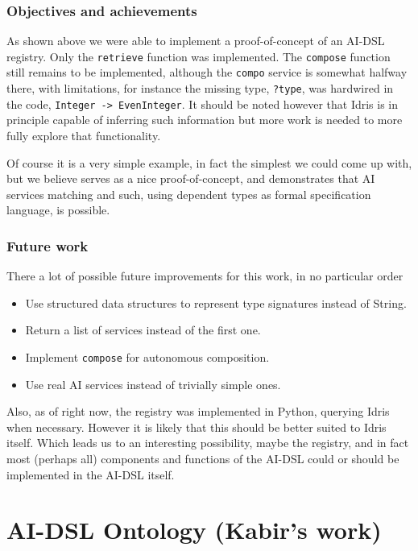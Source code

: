 \documentclass[]{report}
\begin{document}
\subsection{Objectives and achievements}

As shown above we were able to implement a proof-of-concept of an
AI-DSL registry.  Only the \texttt{retrieve} function was implemented.
The \texttt{compose} function still remains to be implemented,
although the \texttt{compo} service is somewhat halfway there, with
limitations, for instance the missing type, \texttt{?type}, was
hardwired in the code, \texttt{Integer -> EvenInteger}.  It should be
noted however that Idris is in principle capable of inferring such
information but more work is needed to more fully explore that
functionality.

Of course it is a very simple example, in fact the simplest we could
come up with, but we believe serves as a nice proof-of-concept, and
demonstrates that AI services matching and such, using dependent types
as formal specification language, is possible.

\subsection{Future work}

There a lot of possible future improvements for this work, in no
particular order
\begin{itemize}
\item Use structured data structures to represent type signatures
  instead of String.
\item Return a list of services instead of the first one.
\item Implement \texttt{compose} for autonomous composition.
\item Use real AI services instead of trivially simple ones.
\end{itemize}

Also, as of right now, the registry was implemented in Python,
querying Idris when necessary.  However it is likely that this should
be better suited to Idris itself.  Which leads us to an interesting
possibility, maybe the registry, and in fact most (perhaps all)
components and functions of the AI-DSL could or should be implemented
in the AI-DSL itself.

\chapter{AI-DSL Ontology (Kabir's work)}
\end{document}
